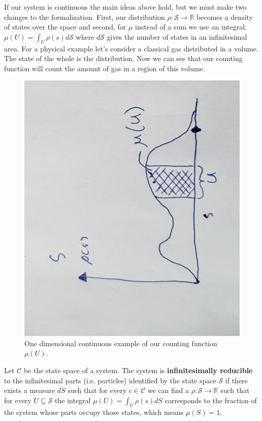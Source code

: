 \documentclass{article}
\begin{document}
	
	If our system is continuous the main ideas above hold, but we must make two changes to the formalization. First, our distribution $\rho : \mathcal{S} \to \mathbb{R}$ becomes a density of states over the space and second, for $\mu$ instead of a sum we use an integral: $\mu(U) = \int_{U} \rho(s) d\mathcal{S}$ where $d\mathcal{S}$ gives the number of states in an infinitesimal area. For a physical example let's consider a classical gas distributed in a volume. The state of the whole is the distribution. Now we can see that our counting function will count the amount of gas in a region of this volume.
\begin{figure}[!ht]
\centerline{\includegraphics[width=\textwidth,angle=-90,scale=.45]{diagram4.jpg}}
\caption{One dimensional continuous example of our counting function $\mu(U)$.}
\end{figure}
	
\begin{defn}
	Let $\mathcal{C}$ be the state space of a system. The system is \textbf{infinitesimally reducible} to the infinitesimal parts (i.e. particles) identified by the state space $\mathcal{S}$ if there exists a measure $dS$ such that for every $c \in \mathcal{C}$ we can find a $\rho : \mathcal{S} \to \mathbb{R}$ such that for every $U \subseteq \mathcal{S}$ the integral $\mu(U) = \int_U \rho(s) dS$ corresponds to the fraction of the system whose parts occupy those states, which means $\mu(S) = 1$.
\end{defn}	
	
\end{document}
